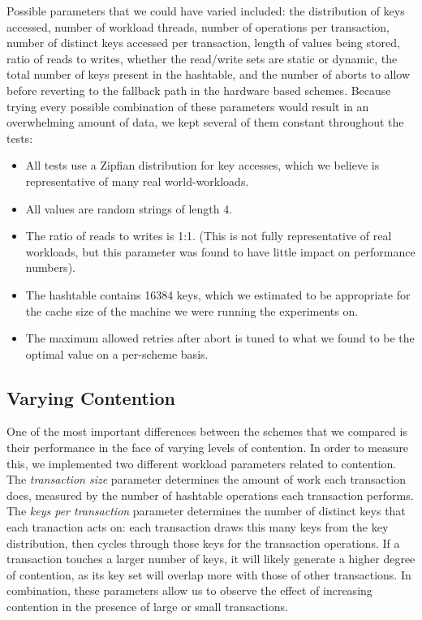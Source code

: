 Possible parameters that we could have varied included: the distribution of keys
accessed, number of workload threads, number of operations per transaction,
number of distinct keys accessed per transaction, length of values being stored,
ratio of reads to writes, whether the read/write sets are static or dynamic, the
total number of keys present in the hashtable, and the number of aborts to allow
before reverting to the fallback path in the hardware based schemes. Because
trying every possible combination of these parameters would result in an
overwhelming amount of data, we kept several of them constant throughout the
tests:
\begin{itemize}
\item All tests use a Zipfian distribution for key accesses, which we believe is
  representative of many real world-workloads.
\item All values are random strings of length 4.
\item The ratio of reads to writes is 1:1. (This is not fully representative of
  real workloads, but this parameter was found to have little impact on
  performance numbers).
\item The hashtable contains 16384 keys, which we estimated to be appropriate
  for the cache size of the machine we were running the experiments on.
\item The maximum allowed retries after abort is tuned to what we found to be
  the optimal value on a per-scheme basis.
\end{itemize}

\subsection{Varying Contention}

One of the most important differences between the schemes that we compared is
their performance in the face of varying levels of contention. In order to
measure this, we implemented two different workload parameters related to
contention. The \textit{transaction size} parameter determines the amount of
work each transaction does, measured by the number of hashtable operations each
transaction performs.  The \textit{keys per transaction} parameter determines
the number of distinct keys that each tranaction acts on: each transaction draws
this many keys from the key distribution, then cycles through those keys for the
transaction operations. If a transaction touches a larger number of keys, it
will likely generate a higher degree of contention, as its key set will overlap
more with those of other transactions. In combination, these parameters allow us
to observe the effect of increasing contention in the presence of large or small
transactions.

